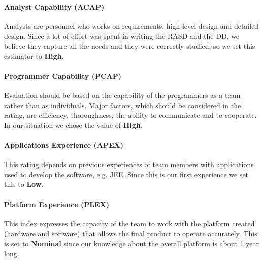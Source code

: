 \paragraph{Analyst Capability (ACAP)} Analysts are personnel who works on requirements, high-level design and detailed design. Since a lot of effort was spent in writing the RASD and the DD, we believe they capture all the needs and they were correctly studied, so we set this estimator to \textbf{High}.


\paragraph{Programmer Capability (PCAP)} Evaluation should be based on the capability of the programmers as a team rather than as individuals. Major factors, which should be considered in the rating, are efficiency, thoroughness, the ability to communicate and to cooperate. In our situation we chose the value of \textbf{High}.


\paragraph{Applications Experience (APEX)} This rating depends on previous experiences of team members with applications used to develop the software, e.g. JEE. Since this is our first experience we set this to \textbf{Low}.


\paragraph{Platform Experience (PLEX)} This index expresses the capacity of the team to work with the platform created (hardware and software) that allows the final product to operate accurately. 
This is set to \textbf{Nominal} since our knowledge about the overall platform is about 1 year long.
   
